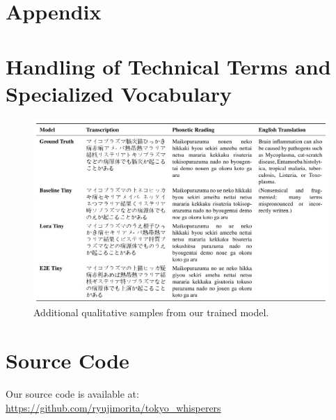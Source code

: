 \documentclass[10pt,twocolumn,letterpaper]{article}
\begin{document}
\clearpage

{\small
%


}

\clearpage

\appendix
\renewcommand{\thesection}{\Alph{section}}
\setcounter{section}{0}

\onecolumn

\section*{Appendix}

\section{Handling of Technical Terms and Specialized Vocabulary}

\begin{figure}[htbp]
    \centering
    \includegraphics[width=0.9\linewidth]{./app_table.png}
    \caption{Additional qualitative samples from our trained model.}
    \label{tab:transcription_comparison_appendix}
\end{figure}

\section{Source Code}

\noindent Our source code is available at:  
\url{https://github.com/ryujimorita/tokyo_whisperers}

\twocolumn
\end{document}
